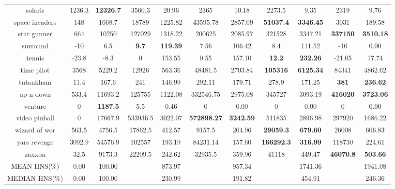 \begin{center}
{\begin{tabular}{ccccccccccc}
 solaris & 1236.3 & \textbf{12326.7} & 3560.3  & 20.96  & 2365      & 10.18   & 2273.5   & 9.35    & 2319 & 9.76 \\
 space invaders & 148 & 1668.7 & 18789 & 1225.82 & 43595.78 & 2857.09 & \textbf{51037.4} & \textbf{3346.45} & 3031 & 189.58 \\
 star gunner & 664 & 10250 & 127029    & 1318.22 & 200625   & 2085.97 & 321528  & 3347.21 & \textbf{337150} & \textbf{3510.18} \\
 surround    & -10 & 6.5   & \textbf{9.7}       & \textbf{119.39}  & 7.56     & 106.42  & 8.4     & 111.52  & -10  & 0.00 \\
 tennis  & -23.8   & -8.3 & 0        & 153.55    & 0.55     & 157.10  & \textbf{12.2}    & \textbf{232.26}  & -21.05 & 17.74 \\
 time pilot & 3568 & 5229.2 & 12926 & 563.36     & 48481.5  & 2703.84 & \textbf{105316}  & \textbf{6125.34} & 84341 & 4862.62 \\
 tutankham  & 11.4 & 167.6  & 241   & 146.99     & 292.11   & 179.71  & 278.9   & 171.25  & \textbf{381} & \textbf{236.62} \\
 up n down  & 533.4 & 11693.2 & 125755 & 1122.08 & 332546.75 & 2975.08 & 345727 & 3093.19 & \textbf{416020} & \textbf{3723.06} \\
 venture    & 0     & \textbf{1187.5}  & 5.5    & 0.46    & 0         & 0.00    & 0      & 0.00    & 0  & 0.00 \\
 video pinball & 0 & 17667.9  & 533936.5 & 3022.07 & \textbf{572898.27} & \textbf{3242.59} & 511835 & 2896.98 & 297920 & 1686.22 \\
 wizard of wor & 563.5 & 4756.5 & 17862.5 & 412.57 & 9157.5    & 204.96  & \textbf{29059.3} & \textbf{679.60} & 26008 & 606.83 \\
 yars revenge & 3092.9 & 54576.9 & 102557 & 193.19 & 84231.14  & 157.60 & \textbf{166292.3} & \textbf{316.99} & 118730 & 224.61 \\
 zaxxon       & 32.5   & 9173.3 & 22209.5 & 242.62 & 32935.5   & 359.96 & 41118    & 449.47 & \textbf{46070.8}  & \textbf{503.66} \\
\hline
MEAN HNS(\%) &     0.00 & 100.00   &         & 873.97 &         & 957.34  &        & 1741.36 &      & 1941.08 \\
\hline
MEDIAN HNS(\%) & 0.00   & 100.00   &         & 230.99 &         & 191.82  &        & 454.91  &      & 246.36 \\
\bottomrule
\end{tabular}
}
\end{center}
\normalsize
\clearpage

